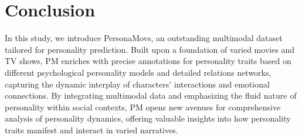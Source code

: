 \section{Conclusion}

In this study, we introduce PersonaMovs, an outstanding multimodal dataset tailored for personality prediction. Built upon a foundation of varied movies and TV shows, PM enriches with precise annotations for personality traits based on different psychological personality models and detailed relations networks, capturing the dynamic interplay of characters' interactions and emotional connections. By integrating multimodal data and emphasizing the fluid nature of personality within social contexts, PM opens new avenues for comprehensive analysis of personality dynamics, offering valuable insights into how personality traits manifest and interact in varied narratives.